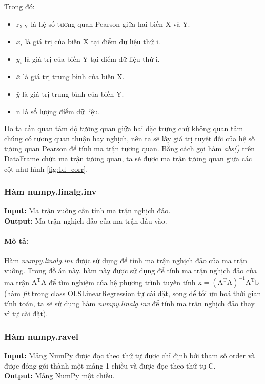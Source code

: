 \documentclass[]{article}
\begin{document}
Trong đó:
\begin{itemize}
    \item $\text{r}_{\text{X,Y}}$ là hệ số tương quan Pearson giữa hai biến X và Y.
    \item $x_i$ là giá trị của biến X tại điểm dữ liệu thứ i.
    \item $y_i$ là giá trị của biến Y tại điểm dữ liệu thứ i.
    \item $\bar{x}$ là giá trị trung bình của biến X.
    \item $\bar{y}$ là giá trị trung bình của biến Y.
    \item n là số lượng điểm dữ liệu.
\end{itemize}

Do ta cần quan tâm độ tương quan giữa hai đặc trưng chứ không quan tâm chúng có tương quan thuận hay nghịch, nên ta sẽ lấy giá trị tuyệt đối của hệ số tương quan Pearson để tính ma trận tương quan. Bằng cách gọi hàm \textit{abs()} trên DataFrame chứa ma trận tương quan, ta sẽ được ma trận tương quan giữa các cột như hình \ref{fig:1d_corr}.

\subsubsection{Hàm numpy.linalg.inv}
\noindent
\textbf{Input:} Ma trận vuông cần tính ma trận nghịch đảo. \\
\textbf{Output:} Ma trận nghịch đảo của ma trận đầu vào.
\paragraph{Mô tả:}

Hàm \textit{numpy.linalg.inv} \cite{numpyNumpylinalginv} được sử dụng để tính ma trận nghịch đảo của ma trận vuông. Trong đồ án này, hàm này được sử dụng để tính ma trận nghịch đảo của ma trận $\text{A}^\text{T} \text{A}$ để tìm nghiệm của hệ phương trình tuyến tính $\text{x} = (\text{A}^\text{T} \text{A})^{-1} \text{A}^\text{T} \text{b}$ (hàm \textit{fit} trong class OLSLinearRegression tự cài đặt, song để tối ưu hoá thời gian tính toán, ta sẽ sử dụng hàm \textit{numpy.linalg.inv} để tính ma trận nghịch đảo thay vì tự cài đặt).

\subsubsection{Hàm numpy.ravel}
\noindent
\textbf{Input:} Mảng NumPy được đọc theo thứ tự được chỉ định bởi tham số order và được đóng gói thành một mảng 1 chiều và được đọc theo thứ tự C. \\
\textbf{Output:} Mảng NumPy một chiều.
\end{document}
